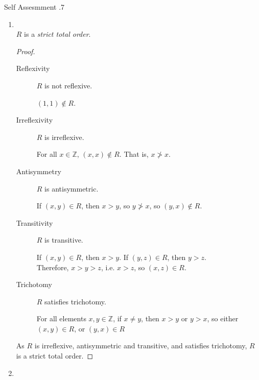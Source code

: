 \documentclass[../notes.tex]{subfiles}
\begin{document}
\begin{exercise}{Self Assesmment \thechapter.7}
\begin{enumerate}
\begin{proof}
								As $R$ is reflexive, antisymmetric and transitive, and satisfies trichotomy, $R$ is a weak total order.
							\end{proof}
						\item {}\\
							$R$ is a \emph{strict total order}.
							\begin{proof}
								$ $
								\begin{description}
									\item[Reflexivity] $R$ is not reflexive.
										\begin{subproof}[Counterexample]
											$(1, 1) \notin R$.
										\end{subproof}
									\item[Irreflexivity] $R$ is irreflexive.
										\begin{subproof}
											For all $x \in \mathbb{Z}$, $(x, x) \notin R$. That is, $x \not > x$.
										\end{subproof}
									\item[Antisymmetry] $R$ is antisymmetric.
										\begin{subproof}
											If $(x, y) \in R$, then $x > y$, so $y \not > x$, so $(y, x) \notin R$.
										\end{subproof}
									\item[Transitivity] $R$ is transitive.
										\begin{subproof}
											If $(x, y) \in R$, then $x > y$. If $(y, z) \in R$, then $y > z$.\\
											Therefore, $x > y > z$, i.e. $x > z$, so $(x, z) \in R$.
										\end{subproof}
									\item[Trichotomy] $R$ satisfies trichotomy.
										\begin{subproof}
											For all elements $x, y \in \mathbb{Z}$, if $x \neq y$, then $x > y$ or $y > x$, so either $(x, y) \in R$, or $(y, x) \in R$
										\end{subproof}
								\end{description}
								As $R$ is irreflexive, antisymmetric and transitive, and satisfies trichotomy, $R$ is a strict total order.
							\end{proof}
						\pagebreak
						\item {}\\

\end{enumerate}
\end{exercise}
\end{document}
